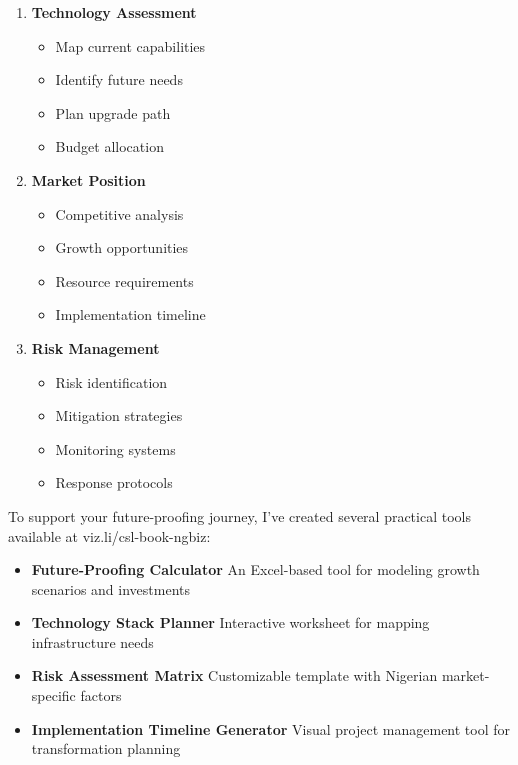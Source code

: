 \begin{enumerate}
    \item \textbf{Technology Assessment}
    \begin{itemize}
        \item Map current capabilities
        \item Identify future needs
        \item Plan upgrade path
        \item Budget allocation
    \end{itemize}

    \item \textbf{Market Position}
    \begin{itemize}
        \item Competitive analysis
        \item Growth opportunities
        \item Resource requirements
        \item Implementation timeline
    \end{itemize}

    \item \textbf{Risk Management}
    \begin{itemize}
        \item Risk identification
        \item Mitigation strategies
        \item Monitoring systems
        \item Response protocols
    \end{itemize}
\end{enumerate}

To support your future-proofing journey, I've created several practical tools available at viz.li/csl-book-ngbiz:

\begin{itemize}
    \item \textbf{Future-Proofing Calculator}
    An Excel-based tool for modeling growth scenarios and investments

    \item \textbf{Technology Stack Planner}
    Interactive worksheet for mapping infrastructure needs

    \item \textbf{Risk Assessment Matrix}
    Customizable template with Nigerian market-specific factors

    \item \textbf{Implementation Timeline Generator}
    Visual project management tool for transformation planning
\end{itemize}

